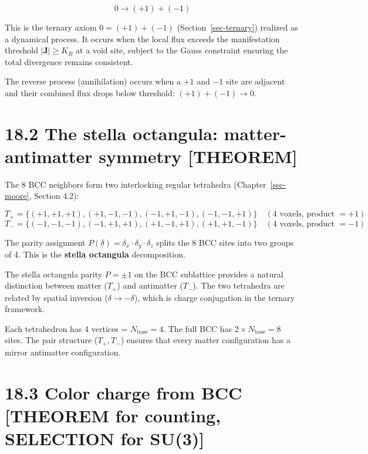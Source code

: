 \documentclass[
  11pt,
  letterpaper,
  twoside,
  openright]{book}
\begin{document}
\[
0 \to (+1) + (-1)
\tag{18.1}
\]

This is the ternary axiom \(0 = (+1) + (-1)\)
(Section~\ref{sec-ternary}) realized as a dynamical process. It occurs
when the local flux exceeds the manifestation threshold
\(|\mathbf{J}| \geq K_B\) at a void site, subject to the Gauss
constraint ensuring the total divergence remains consistent.

The reverse process (annihilation) occurs when a \(+1\) and \(-1\) site
are adjacent and their combined flux drops below threshold:
\((+1) + (-1) \to 0\).

\section{18.2 The stella octangula: matter-antimatter symmetry
{[}THEOREM{]}}\label{the-stella-octangula-matter-antimatter-symmetry-theorem}

The 8 BCC neighbors form two interlocking regular tetrahedra
(Chapter~\ref{sec-moore}, Section 4.2):

\[
T_+ = \{(+1,+1,+1), (+1,-1,-1), (-1,+1,-1), (-1,-1,+1)\} \quad (\text{4 voxels, product } = +1)
\] \[
T_- = \{(-1,-1,-1), (-1,+1,+1), (+1,-1,+1), (+1,+1,-1)\} \quad (\text{4 voxels, product } = -1)
\]

The parity assignment
\(P(\delta) = \delta_x \cdot \delta_y \cdot \delta_z\) splits the 8 BCC
sites into two groups of 4. This is the \textbf{stella octangula}
decomposition.

\begin{ftdtheorem}

The stella octangula parity \(P = \pm 1\) on the BCC sublattice provides
a natural distinction between matter (\(T_+\)) and antimatter (\(T_-\)).
The two tetrahedra are related by spatial inversion
(\(\delta \to -\delta\)), which is charge conjugation in the ternary
framework.

\end{ftdtheorem}

Each tetrahedron has 4 vertices = \(N_{\text{base}} = 4\). The full BCC
has \(2 \times N_{\text{base}} = 8\) sites. The pair structure
(\(T_+, T_-\)) ensures that every matter configuration has a mirror
antimatter configuration.

\section{18.3 Color charge from BCC {[}THEOREM for counting, SELECTION
for
SU(3){]}}\label{color-charge-from-bcc-theorem-for-counting-selection-for-su3}
\end{document}
